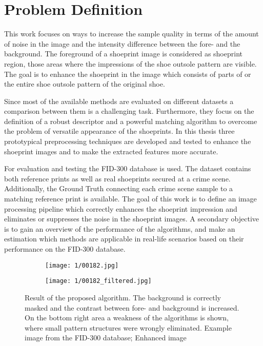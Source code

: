 \documentclass[draft,final]{vutinfth} %
\begin{document}
\section{Problem Definition}
\par
This work focuses on ways to increase the sample quality in terms of the amount of noise in the image and the intensity difference between the fore- and the background.
The foreground of a shoeprint image is considered as shoeprint region, those areas where the impressions of the shoe outsole pattern are visible.
The goal is to enhance the shoeprint in the image which consists of parts of or the entire shoe outsole pattern of the original shoe.   
\par
Since most of the available methods are evaluated on different datasets a comparison between them is a challenging task.
Furthermore, they focus on the definition of a robust descriptor and a powerful matching algorithm to overcome the problem of versatile appearance of the shoeprints.
In this thesis three prototypical preprocessing techniques are developed and tested to enhance the shoeprint images and to make the extracted features more accurate. 
\par
For evaluation and testing the FID-300 database is used.
The dataset contains both reference prints as well as real shoeprints secured at a crime scene.
Additionally, the Ground Truth connecting each crime scene sample to a matching reference print is available.
The goal of this work is to define an image processing pipeline which correctly enhances the shoeprint impression and eliminates or suppresses the noise in the shoeprint images.
A secondary objective is to gain an overview of the performance of the algorithms, and make an estimation which methods are applicable in real-life scenarios based on their performance on the FID-300 database. 

\begin{figure}[h]
  \centering
  \begin{subfigure}[t]{0.45\columnwidth}
    \centering
    \texttt{[image: 1/00182.jpg]}
    \subcaption{}
    \label{fig:intro:orig}
  \end{subfigure}
  \begin{subfigure}[t]{0.45\columnwidth}
    \centering
    \texttt{[image: 1/00182\_filtered.jpg]}
    \subcaption{}
    \label{fig:intro:enhanced}
  \end{subfigure}
  \caption{Result of the proposed algorithm. The background is correctly masked and the contrast between fore- and background is increased. On the bottom right area a weakness of the algorithms is shown, where small pattern structures were wrongly eliminated.  Example image from the FID-300 database;  Enhanced image}
  \label{fig:example}
\end{figure}
\end{document}
